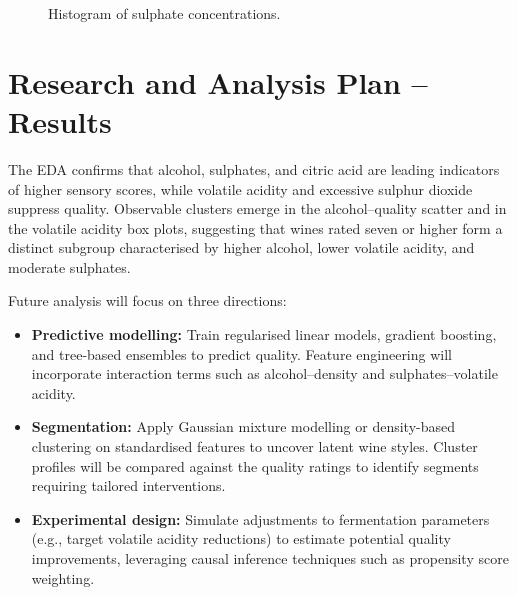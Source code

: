 \documentclass[11pt]{article}
\begin{document}
\begin{figure}[H]
  \centering
  \caption{Histogram of sulphate concentrations.}
  \label{fig:sulphates-hist}
\end{figure}

\section{Research and Analysis Plan -- Results}
The EDA confirms that alcohol, sulphates, and citric acid are leading indicators
of higher sensory scores, while volatile acidity and excessive sulphur dioxide
suppress quality. Observable clusters emerge in the alcohol--quality scatter and
in the volatile acidity box plots, suggesting that wines rated seven or higher
form a distinct subgroup characterised by higher alcohol, lower volatile acidity,
and moderate sulphates.

Future analysis will focus on three directions:
\begin{itemize}
  \item \textbf{Predictive modelling:} Train regularised linear models, gradient boosting, and tree-based ensembles to predict quality. Feature engineering will incorporate interaction terms such as alcohol--density and sulphates--volatile acidity.
  \item \textbf{Segmentation:} Apply Gaussian mixture modelling or density-based clustering on standardised features to uncover latent wine styles. Cluster profiles will be compared against the quality ratings to identify segments requiring tailored interventions.
  \item \textbf{Experimental design:} Simulate adjustments to fermentation parameters (e.g., target volatile acidity reductions) to estimate potential quality improvements, leveraging causal inference techniques such as propensity score weighting.
\end{itemize}
\end{document}
